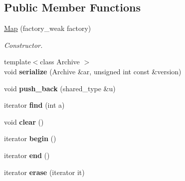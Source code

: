 \subsection*{Public Member Functions}
\begin{DoxyCompactItemize}
\item 
\hypertarget{classNeb_1_1Map_a7e15e6246362cebda8a9fbf6e4fdfff2}{\hyperlink{classNeb_1_1Map_a7e15e6246362cebda8a9fbf6e4fdfff2}{Map} (factory\-\_\-weak factory)}\label{classNeb_1_1Map_a7e15e6246362cebda8a9fbf6e4fdfff2}

\begin{DoxyCompactList}\small\item\em Constructor. \end{DoxyCompactList}\item 
\hypertarget{classNeb_1_1Map_a2657f69e25b421e8fab7a6e7cb116d77}{{\footnotesize template$<$class Archive $>$ }\\void {\bfseries serialize} (Archive \&ar, unsigned int const \&version)}\label{classNeb_1_1Map_a2657f69e25b421e8fab7a6e7cb116d77}

\item 
\hypertarget{classNeb_1_1Map_a628b2826bd845181f8fdec7de0255aff}{void {\bfseries push\-\_\-back} (shared\-\_\-type \&u)}\label{classNeb_1_1Map_a628b2826bd845181f8fdec7de0255aff}

\item 
\hypertarget{classNeb_1_1Map_a3e040f5d07053dbdc8853e242f633142}{iterator {\bfseries find} (int a)}\label{classNeb_1_1Map_a3e040f5d07053dbdc8853e242f633142}

\item 
\hypertarget{classNeb_1_1Map_ae0fedef74480d411f5b35583927e237c}{void {\bfseries clear} ()}\label{classNeb_1_1Map_ae0fedef74480d411f5b35583927e237c}

\item 
\hypertarget{classNeb_1_1Map_aaa7f3f7057179fef6a38559258a217b4}{iterator {\bfseries begin} ()}\label{classNeb_1_1Map_aaa7f3f7057179fef6a38559258a217b4}

\item 
\hypertarget{classNeb_1_1Map_abd67f06c1909b3cb1982d7637c7a3877}{iterator {\bfseries end} ()}\label{classNeb_1_1Map_abd67f06c1909b3cb1982d7637c7a3877}

\item 
\hypertarget{classNeb_1_1Map_a0d5ff20f0bce0ca3a55ed0d204d138bb}{iterator {\bfseries erase} (iterator it)}\label{classNeb_1_1Map_a0d5ff20f0bce0ca3a55ed0d204d138bb}

\end{DoxyCompactItemize}

